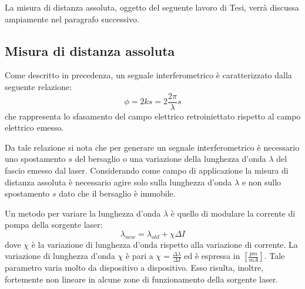 La misura di distanza assoluta, oggetto del seguente lavoro di Tesi, verrà discussa ampiamente nel paragrafo successivo.

\subsection{Misura di distanza assoluta}
Come descritto in precedenza, un segnale interferometrico è caratterizzato dalla seguente relazione:
\begin{equation}
	\phi = 2ks = 2 \frac{2\pi}{\lambda}s
	\label{distass}
\end{equation}
che rappresenta lo sfasamento del campo elettrico retroiniettato rispetto al campo elettrico emesso.

Da tale relazione si nota che per generare un segnale interferometrico è necessario uno spostamento $s$ del bersaglio o una variazione della lunghezza d'onda $\lambda$ del fascio emesso dal laser. Considerando come campo di applicazione la misura di distanza assoluta è necessario agire solo sulla lunghezza d'onda $\lambda$ e non sullo spostamento $s$ dato che il bersaglio è immobile.

Un metodo per variare la lunghezza d'onda $\lambda$ è quello di modulare la corrente di pompa della sorgente laser:
\begin{equation}
		\lambda_{new}=\lambda_{old}+\chi\Delta I
		\label{lungondanew}
\end{equation}
dove $\chi$ è la variazione di lunghezza d'onda rispetto alla variazione di corrente. La variazione di lunghezza d'onda $\chi$ è pari a $\chi = \frac{\Delta \lambda}{\Delta I}$ ed è espressa in $\left [ \frac{pm}{mA} \right ]$. Tale parametro varia molto da dispositivo a dispositivo. Esso risulta, inoltre, fortemente non lineare in alcune zone di funzionamento della sorgente laser. 

